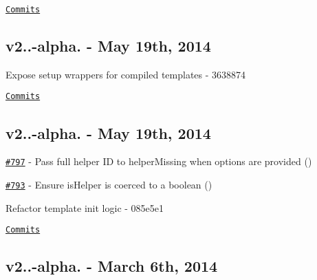 \href{https://github.com/wycats/handlebars.js/compare/v2.0.0-alpha.4...v2.0.0-beta.1}{\tt Commits}

\subsection*{v2..-\/alpha. -\/ May 19th, 2014}


\begin{DoxyItemize}
\item Expose setup wrappers for compiled templates -\/ 3638874
\end{DoxyItemize}

\href{https://github.com/wycats/handlebars.js/compare/v2.0.0-alpha.3...v2.0.0-alpha.4}{\tt Commits}

\subsection*{v2..-\/alpha. -\/ May 19th, 2014}


\begin{DoxyItemize}
\item \href{https://github.com/wycats/handlebars.js/pull/797}{\tt \#797} -\/ Pass full helper I\+D to helper\+Missing when options are provided (\href{https://api.github.com/users/tomdale}{\tt })
\item \href{https://github.com/wycats/handlebars.js/pull/793}{\tt \#793} -\/ Ensure is\+Helper is coerced to a boolean (\href{https://api.github.com/users/mmun}{\tt })
\item Refactor template init logic -\/ 085e5e1
\end{DoxyItemize}

\href{https://github.com/wycats/handlebars.js/compare/v2.0.0-alpha.2...v2.0.0-alpha.3}{\tt Commits}

\subsection*{v2..-\/alpha. -\/ March 6th, 2014}


